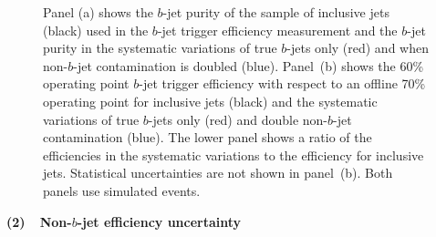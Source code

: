 \begin{figure}[!htb]
  \begin{center}
    \captionsetup[subfigure]{aboveskip=0pt,justification=centering}
    \hspace{-0.5cm}
  \end{center}
\vspace{-1em}
  \caption[The $b$-jet purity and $b$-jet trigger efficiency when the size of the non-$b$-jet contamination is systematically varied.]
          {\label{fig:Eff_Purity} Panel (a) shows the $b$-jet purity of the sample of inclusive jets (black) used in the $b$-jet trigger efficiency measurement
    and the $b$-jet purity in the systematic variations of true $b$-jets only (red) and when non-$b$-jet contamination is doubled (blue).
    Panel~(b) shows the 60\% operating point $b$-jet trigger efficiency with respect to an offline 70\% operating point for inclusive jets (black)
    and the systematic variations of true $b$-jets only (red) and double non-$b$-jet contamination (blue).
    The lower panel shows a ratio of the efficiencies in the systematic variations to the efficiency for inclusive jets.
    Statistical uncertainties are not shown in panel~(b). Both panels use simulated events.}
\end{figure}

\noindent
\textbf{(2)~~Non-$b$-jet efficiency uncertainty}
\label{sec:trig-lightTrigEff}

